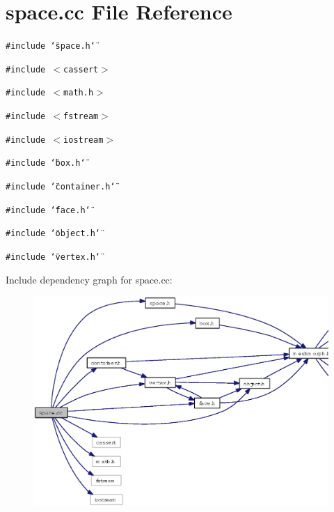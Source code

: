 \section{space.cc File Reference}
\label{space_8cc}
{\tt \#include \char`\"{}space.h\char`\"{}}\par
{\tt \#include $<$cassert$>$}\par
{\tt \#include $<$math.h$>$}\par
{\tt \#include $<$fstream$>$}\par
{\tt \#include $<$iostream$>$}\par
{\tt \#include \char`\"{}box.h\char`\"{}}\par
{\tt \#include \char`\"{}container.h\char`\"{}}\par
{\tt \#include \char`\"{}face.h\char`\"{}}\par
{\tt \#include \char`\"{}object.h\char`\"{}}\par
{\tt \#include \char`\"{}vertex.h\char`\"{}}\par


Include dependency graph for space.cc:\begin{figure}[H]
\begin{center}
\leavevmode
\includegraphics[width=368pt]{space_8cc__incl}
\end{center}
\end{figure}
